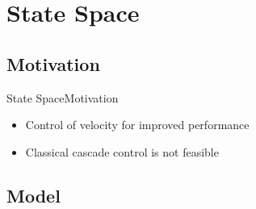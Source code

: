 \section{State Space}

\subsection{Motivation}%
\begin{frame}{State Space}{Motivation}
  \begin{itemize}
    \item Control of velocity for improved performance
    \item Classical cascade control is not feasible
  \end{itemize}
  \begin{figure}[H]
    \centering
    
  \end{figure}
\end{frame}

\subsection{Model}%

